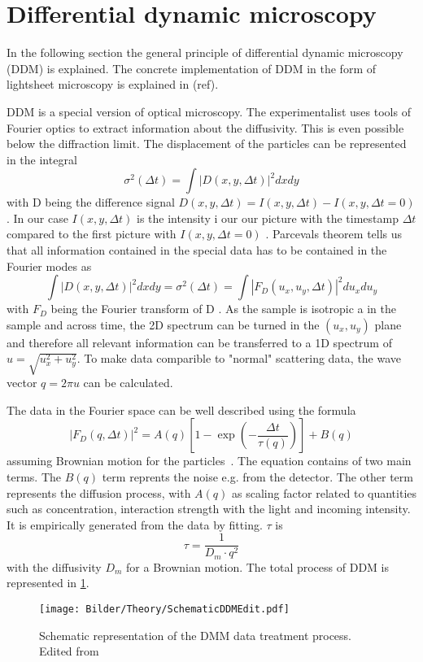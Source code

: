 \section{Differential dynamic microscopy}
\label{sec:DDM}

In the following section the general principle of differential dynamic microscopy (DDM) is explained. The concrete implementation of DDM
in the form of lightsheet microscopy is explained in (ref).

DDM is a special version of optical microscopy. The experimentalist uses tools of Fourier optics to extract information about the 
diffusivity. This is even possible below the diffraction limit. The displacement of the particles can be represented in the integral 
\begin{equation}
    \sigma^2(\Delta t) = \int |D(x,y,\Delta t)|^2 dx dy
\end{equation}
with D being the difference signal $D(x,y,\Delta t) = I(x,y,\Delta t) -I(x,y,\Delta t =0)$. In our case $I(x,y,\Delta t)$ is the intensity i our our 
picture with the timestamp $\Delta t $ compared to the first picture with $I(x,y,\Delta t = 0)$ \cite{Cerbino.2008}. Parcevals theorem tells us that all information
contained in the special data has to be contained in the Fourier modes as 
\begin{equation}
    \int |D(x,y,\Delta t)|^2 dx dy = \sigma^2(\Delta t) = \int |F_D(u_x,u_y,\Delta t)|^2 du_x du_y
\end{equation}
with $F_D$ being the Fourier transform of D \cite{Butz.2012}. As the sample is isotropic a in the sample and across time, the 2D spectrum 
can be turned in the $(u_x, u_y)$ plane and therefore all relevant information can be transferred to a 1D spectrum of $u = \sqrt{u_x^2+u_y^2}$. To make data comparible to 
"normal" scattering data, the wave vector $q = 2\pi u$ can be calculated. 

The data in the Fourier space can be well described using the formula
\begin{equation}
    |F_D(q,\Delta t)|^2 = A(q)[1- \exp(-\frac{\Delta t}{\tau (q)})] +B(q)
\end{equation}
assuming Brownian motion for the particles~\cite{Berne.2013}. The equation contains of two main terms. The $B(q)$ term reprents the 
noise e.g. from the detector. The other term represents the diffusion process, with $A(q)$ as scaling factor related to quantities such as concentration, 
interaction strength with the light and incoming intensity. It is empirically generated from the data by fitting. $\tau$ is 
\begin{equation}
    \tau = \frac{1}{D_m \cdot q^2}
\end{equation} 
with the diffusivity $D_m$ for a Brownian motion. The total process of DDM is represented in \cref{fig:DataTreatDDM}.


\begin{figure}[ht]
    \centering
    \texttt{[image: Bilder/Theory/SchematicDDMEdit.pdf]}
    \caption{Schematic representation of the DMM data treatment process. Edited from~\cite{Struntz.2017}}
    \label{fig:DataTreatDDM}
\end{figure}